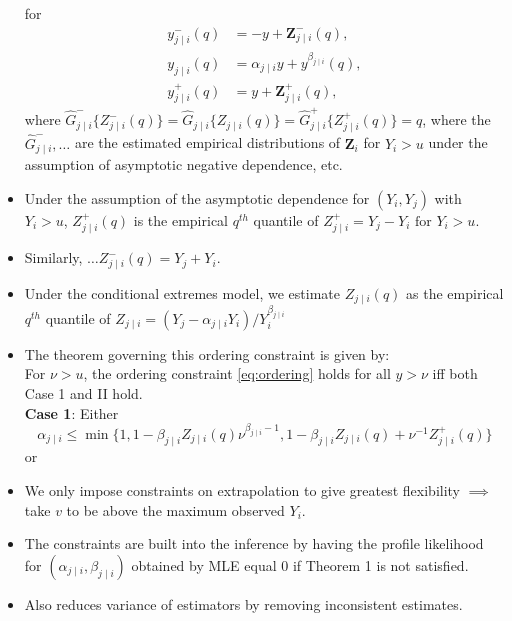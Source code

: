\documentclass{article}
\begin{document}
\begin{itemize}
\begin{equation}
    \end{equation}
    for
    \begin{align*}
      y^-_{j \mid i}(q) &= -y + \bm{Z}_{j \mid i}^-(q), \\
      y_{j \mid i}(q) &= \alpha_{j \mid i}y + y^{\beta_{j \mid i}}(q), \\
      y^+_{j \mid i}(q) &= y + \bm{Z}_{j \mid i}^+(q),
    \end{align*}
    where
    $\hat{G}^-_{j\mid i}\{Z^-_{j \mid i}(q)\} = 
    \hat{G}_{j\mid i}\{Z_{j \mid i}(q)\} = 
  \hat{G}^+_{j\mid i}\{Z^+_{j \mid i}(q)\} = q$, where the $\hat{G}^-_{j \mid i}, \ldots$ are the estimated empirical distributions of $\bm{Z}_i$ for $Y_i > u$ under the assumption of asymptotic negative dependence, etc.
  \item Under the assumption of the asymptotic dependence for $(Y_i, Y_j)$ with $Y_i > u$, $Z^+_{j \mid i}(q)$ is the empirical $q^{th}$ quantile of $Z^+_{j \mid i} = Y_j - Y_i \text{ for } Y_i > u$. \\
  \item Similarly, $\ldots Z^-_{j \mid i}(q) = Y_j + Y_i$. \\
  \item Under the conditional extremes model, we estimate $Z_{j \mid i}(q)$ as the empirical $q^{th}$ quantile of $Z_{j \mid i} = (Y_j - \alpha_{j \mid i}Y_i) / Y_i^{\beta_{j \mid i}}$
  \item The theorem governing this ordering constraint is given by: \\
    For $\nu > u$, the ordering constraint \ref{eq:ordering} holds for all $y > \nu$ iff both Case 1 and II hold. \\
    \textbf{Case 1}: Either 
    \[
      \alpha_{j \mid i} \le \min\{
      1, 
      1 - \beta_{j \mid i}Z_{j \mid i}(q)\nu^{\beta_{j \mid i} - 1}, 
      1 - \beta_{j \mid i}Z_{j \mid i}(q) + \nu^{-1}Z^+_{j \mid i}(q)
      \}
    \]
    or 
  \item We only impose constraints on extrapolation to give greatest flexibility $\implies$ take $v$ to be above the maximum observed $Y_i$. 
  \item The constraints are built into the inference by having the profile likelihood for $(\alpha_{j \mid i}, \beta_{j \mid i})$ obtained by MLE equal 0 if Theorem 1 is not satisfied.
  \item Also reduces variance of estimators by removing inconsistent estimates. 
\end{itemize}
\end{document}
